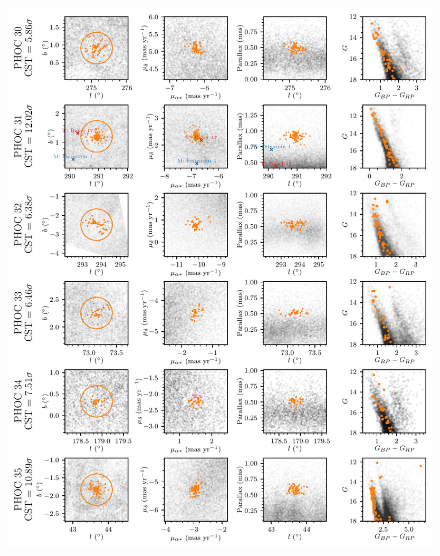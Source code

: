 \begin{figure}[ht]
   \centering
   \includegraphics[width=\textwidth]{fig/c2/fig_new_ocs_5.pdf}
   \caption[Plots of the new OCs PHOC 30 to 35]{}%
   \label{app:c2:fig:new_ocs_5}
\end{figure}

